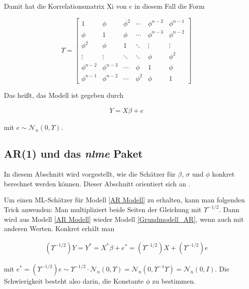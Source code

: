 \documentclass[12pt,a4paper]{article}
\theoremstyle{definition}
\theoremstyle{definition}
\theoremstyle{definition}
\theoremstyle{definition}
\begin{document}
Damit hat die Korrelationsmatrix \gls{Xi} von $e$ in diesem Fall die Form

\begin{equation}\label{Upsilon}
\Upsilon = 
\left[
   \begin{array}{cccccc}
     1 				& \phi 			& \phi^2	& \cdots	& \phi^{n-2}	& \phi^{n-1} 	\\
     \phi 			& 1		 		& \phi 		& \cdots	& \phi^{n-3}	& \phi^{n-2} 	\\
     \phi^2 		& \phi 			& 1		 	& \ddots	& \vdots		& \vdots 		\\
     \vdots		 	& \vdots	 	& \ddots	& \ddots	& \phi			& \phi^{2} 	\\
     \phi^{n-2} 	& \phi^{n-3}	& \cdots 	& \phi		& 1				& \phi 		\\
     \phi^{n-1} 	& \phi^{n-2} 	& \cdots	& \phi^{2}	& \phi			& 1  
   \end{array}
\right]
\end{equation}

Das heißt, das Modell ist gegeben durch 

\begin{align} \label{AR Modell}
Y = X \beta + e
\end{align}

mit $e \sim \mathscr{N}_{n}(0,\Upsilon)$.



\subsection{AR(1) und das \textit{nlme} Paket}
\label{AR(1) und das nlme Paket}

In diesem Abschnitt wird vorgestellt, wie die Schätzer für $\beta$, $\sigma$ und $\phi$ konkret berechnet werden können. Dieser Abschnitt orientiert sich an \cite[203-205]{Pinheiro00}.

Um einen ML-Schätzer für Modell \eqref{AR Modell} zu erhalten, kann man folgenden Trick anwenden: Man multipliziert beide Seiten der Gleichung mit $\Upsilon^{-1/2}$. Dann wird aus Modell \eqref{AR Modell} wieder Modell \eqref{Grundmodell_AR}, wenn auch mit anderen Werten. Konkret erhält man

\begin{align} \label{AR rück}
(\Upsilon^{-1/2})Y = Y^{*} = X^{*} \beta + e^{*} = (\Upsilon^{-1/2})X + (\Upsilon^{-1/2})e
\end{align}

mit $e^{*} = (\Upsilon^{-1/2})e \sim \Upsilon^{-1/2} \cdot \mathscr{N}_{n}(0,\Upsilon) = \mathscr{N}_{n}(0,\Upsilon^{-1}\Upsilon) = \mathscr{N}_{n}(0,I)$. Die Schwierigkeit besteht also darin, die Konstante $\phi$ zu bestimmen. 
\end{document}
